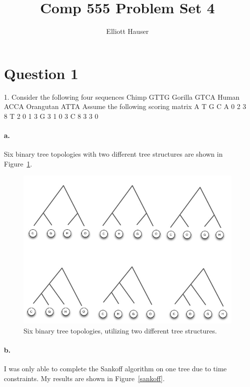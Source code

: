 \documentclass[12pt]{article}
\author{Elliott Hauser}
\title{Comp 555 Problem Set 4}
\begin{document}
\maketitle

\section*{Question 1}
1. Consider the following four sequences 
Chimp GTTG
Gorilla  GTCA
Human  ACCA
Orangutan ATTA
Assume the following scoring matrix
  A T G C
A 0 2 3 8
T 2 0 1 3
G 3 1 0 3
C 8 3 3 0

\paragraph{a.} %
\label{par:1a}
Six binary tree topologies with two different tree structures are shown in Figure~\ref{trees}. 

\begin{figure}[htb]
	\begin{center}
		\includegraphics[width=5in]{trees.jpg}
	\end{center}
	\caption{Six binary tree topologies, utilizing two different tree structures.}
	\label{trees}
\end{figure}

\paragraph{b.}

I was only able to complete the Sankoff algorithm on one tree due to time constraints.  My results are shown in Figure~\ref{sankoff}.
\end{document}
